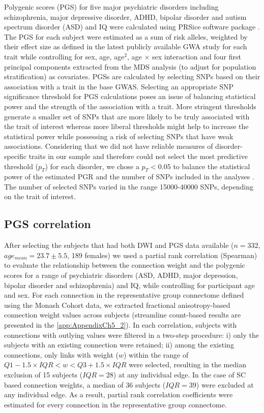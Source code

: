 Polygenic scores (PGS) for five major psychiatric disorders including schizophrenia, major depressive disorder, ADHD, bipolar disorder and autism spectrum disorder (ASD) and IQ were calculated using PRSice software package \citep{Euesden2015}. The PGS for each subject were estimated as a sum of risk alleles, weighted by their effect size as defined in the latest publicly available GWA study for each trait \citep{Neale2010,Ripke2014a,Ruderfer2018,Savage2018,AutismConsortium2017,Wray2018} while controlling for sex, age, age$^{2}$, age $\times$ sex interaction and four first principal components extracted from the MDS analysis (to adjust for population stratification) as covariates. PGSs are calculated by selecting SNPs based on their association with a trait in the base GWAS. Selecting an appropriate SNP significance threshold for PGS calculations poses an issue of balancing statistical power and the strength of the association with a trait. More stringent thresholds generate a smaller set of SNPs that are more likely to be truly associated with the trait of interest whereas more liberal thresholds might help to increase the statistical power while possessing a risk of selecting SNPs that have weak associations. Considering that we did not have reliable measures of disorder-specific traits in our sample and therefore could not select the most predictive threshold ($p_{T}$) for each disorder, we chose a $p_{T}<0.05$ to balance the statistical power of the estimated PGR and the number of SNPs included in the analyses \citep{Ripke2014a}. The number of selected SNPs varied in the range \num{15 000}-\num{40 000} SNPs, depending on the trait of interest.

\subsection{PGS correlation}

After selecting the subjects that had both DWI and PGS data available ($n= 332$, $age_{mean} = 23.7 \pm 5.5$, 189 females) we used a partial rank correlation (Spearman) to evaluate the relationship between the connection weight and the polygenic scores for a range of psychiatric disorders (ASD, ADHD, major depression, bipolar disorder and schizophrenia) and IQ, while controlling for participant age and sex. For each connection in the representative group connectome defined using the Monash Cohort data, we extracted fractional anisotropy-based connection weight values across subjects (streamline count-based results are presented in the \ref{app:AppendixCh5_2}). In each correlation, subjects with connections with outlying values were filtered in a two-step procedure: i) only the subjects with an existing connection were retained; ii) among the existing connections, only links with weight ($w$) within the range of $Q1-1.5 \times IQR< w <Q3+1.5 \times IQR$ were selected, resulting in the median exclusion of 15 subjects ($IQR = 28$) at any individual edge. In the case of SC based connection weights, a median of 36 subjects ($IQR=39$) were excluded at any individual edge. As a result, partial rank correlation coefficients were estimated for every connection in the representative group connectome.

